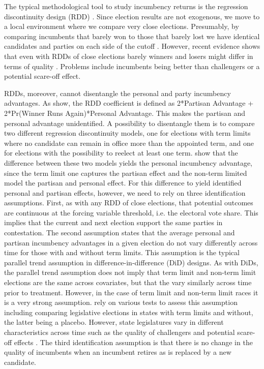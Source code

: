 \documentclass[12pt]{amsart}
\numberwithin{equation}{section}
\theoremstyle{definition}
\theoremstyle{definition}
\theoremstyle{definition}
\begin{document}
The typical methodological tool to study incumbency returns is the regression discontinuity design (RDD) \citep{thistlethwaite_etal_1960, imbens_lemieux_2008, lee_2008}. Since election results are not exogenous, we move to a local environment where we compare very close elections. Presumably, by comparing incumbents that barely won to those that barely lost we have identical candidates and parties on each side of the cutoff \citep{lee_2008, boas_hidalgo_2011, broockman_2009, butler_2009, dalbo_etal_2009, querubin_snyder_2013, titiunik_2012, klasnja_titiunik_2017}. However, recent evidence shows that even with RDDs of close elections barely winners and losers might differ in terms of quality \citep{eggers_2017, caughey_sekhon_2011, grimmer_etal_2012}. Problems include incumbents being better than challengers or a potential scare-off effect. 

RDDs, moreover, cannot disentangle the personal and party incumbency advantages. As \citet{erikson_titiunik_2015} show, the RDD coefficient is defined as 2*Partisan Advantage + 2*Pr(Winner Runs Again)*Personal Advantage. This makes the partisan and personal advantage unidentified. A possibility to disentangle them is to compare two different regression discontinuity models, one for elections with term limits where no candidate can remain in office more than the appointed term, and one for elections with the possibility to reelect at least one term. \citet{fowler_hall_2014} show that the difference between these two models yields the personal incumbency advantage, since the term limit one captures the partisan effect and the non-term limited model the partisan and personal effect. For this difference to yield identified personal and partisan effects, however, we need to rely on three identification assumptions. First, as with any RDD of close elections, that potential outcomes are continuous at the forcing variable threshold, i.e. the electoral vote share. This implies that the current and next election support the same parties in contestation. The second assumption states that the average personal and partisan incumbency advantages in a given election do not vary differently across time for those with and without term limits. This assumption is the typical parallel trend assumption in difference-in-difference (DiD) designs. As with DiDs, the parallel trend assumption does not imply that term limit and non-term limit elections are the same across covariates, but that the vary similarly across time prior to treatment. However, in the case of term limit and non-term limit races it is a very strong assumption. \citet{fowler_hall_2014} rely on various tests to assess this assumption including comparing legislative elections in states with term limits and without, the latter being a placebo. However, state legislatures vary in different characteristics across time such as the quality of challengers and potential scare-off effects \citep{rogers_2014}. The third identification assumption is that there is no change in the quality of incumbents when an incumbent retires as is replaced by a new candidate. 
\end{document}

